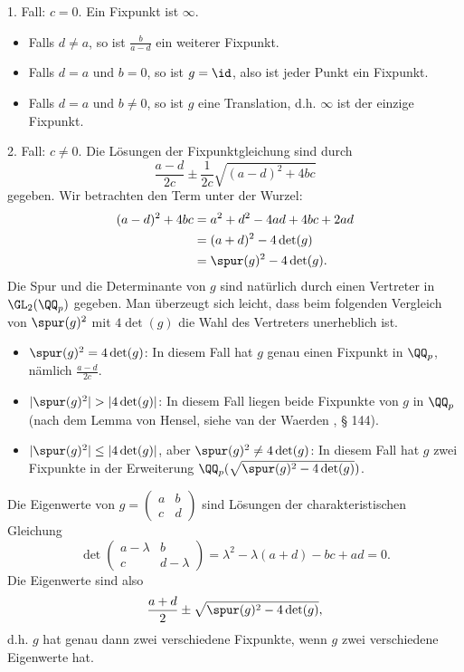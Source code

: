 1. Fall: $c=0$. Ein Fixpunkt ist $\infty$.
\begin{itemize}
\item Falls $d\neq a$, so ist $\frac{b}{a-d}$ ein weiterer Fixpunkt.
\item Falls $d=a$ und $b=0$, so ist $g=\id$, also ist jeder
Punkt ein Fixpunkt.
\item Falls $d=a$ und $b\neq 0$, so ist $g$ eine Translation,
d.h. $\infty$ ist der einzige Fixpunkt.
\end{itemize}

2. Fall: $c\neq 0$. Die Lösungen der Fixpunktgleichung sind
durch
\[
\frac{a-d}{2c}\pm \frac{1}{2c}\sqrt{(a-d)^2+4bc}
\]
gegeben. Wir betrachten den Term unter der Wurzel:
\begin{align*}
(a-d)^2+4bc &= a^2+d^2-4ad+4bc+2ad \\
&= (a+d)^2 - 4 \det(g) \\
&=\spur(g)^2 - 4 \det(g).
\end{align*}
Die Spur und die Determinante von $g$ sind natürlich durch einen
Vertreter in $\GL_2(\QQ_p)$ gegeben.
Man überzeugt sich leicht, dass beim folgenden
Vergleich von $\spur(g)^2$ mit $4\det(g)$ die Wahl des
Vertreters unerheblich ist.
\begin{itemize}
\item $\spur(g)^2=4\det(g)$: In diesem Fall hat $g$
genau einen Fixpunkt in $\QQ_p$, nämlich $\frac{a-d}{2c}$.
\item $|\spur(g)^2|>|4\det(g)|$: In diesem Fall liegen
beide Fixpunkte von $g$ in $\QQ_p$ (nach dem Lemma von Hensel,
siehe van der Waerden \cite{vdW}, § 144).
\item $|\spur(g)^2|\leq|4\det(g)|$, aber
$\spur(g)^2\neq 4\det(g)$: In diesem Fall hat $g$
zwei Fixpunkte in der Erweiterung
$\QQ_p(\sqrt{\spur(g)^2-4\det(g)})$.
\end{itemize}

\BEM Die Eigenwerte von
$g=\begin{pmatrix}a&b\\ c&d\end{pmatrix}$
sind Lösungen der charakteristischen Gleichung
\[
\det
\begin{pmatrix}a-\lambda&b\\ c&d-\lambda\end{pmatrix}
=
\lambda^2 - \lambda(a+d) - bc + ad = 0.
\]
Die Eigenwerte sind also
\[
\frac{a+d}{2} \pm \sqrt{\spur(g)^2 - 4\det(g)},
\]
d.h. $g$ hat genau dann zwei verschiedene Fixpunkte,
wenn $g$ zwei verschiedene Eigenwerte hat.

